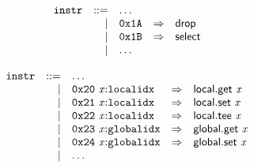 \vspace{1ex}

$$
\begin{array}{@{}l@{}rrlll@{}l@{}}
& {\mathtt{instr}} &::=& \dots \\ &&|&
\mathtt{0x1A} &\Rightarrow& \mathsf{drop} \\ &&|&
\mathtt{0x1B} &\Rightarrow& \mathsf{select} \\ &&|&
\dots \\
\end{array}
$$

\vspace{1ex}

$$
\begin{array}{@{}l@{}rrlll@{}l@{}}
& {\mathtt{instr}} &::=& \dots \\ &&|&
\mathtt{0x20}~{\mathit{x}}{:}{\mathtt{localidx}} &\Rightarrow& \mathsf{local.get}~{\mathit{x}} \\ &&|&
\mathtt{0x21}~{\mathit{x}}{:}{\mathtt{localidx}} &\Rightarrow& \mathsf{local.set}~{\mathit{x}} \\ &&|&
\mathtt{0x22}~{\mathit{x}}{:}{\mathtt{localidx}} &\Rightarrow& \mathsf{local.tee}~{\mathit{x}} \\ &&|&
\mathtt{0x23}~{\mathit{x}}{:}{\mathtt{globalidx}} &\Rightarrow& \mathsf{global.get}~{\mathit{x}} \\ &&|&
\mathtt{0x24}~{\mathit{x}}{:}{\mathtt{globalidx}} &\Rightarrow& \mathsf{global.set}~{\mathit{x}} \\ &&|&
\dots \\
\end{array}
$$

\vspace{1ex}

